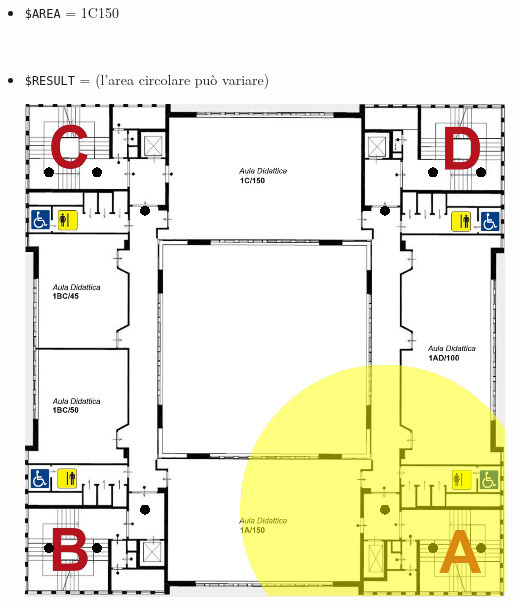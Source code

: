 \documentclass[../../SperimentazioniPratiche.tex]{subfiles}
\begin{document}
			\begin{tcolorbox}[fonttitle=\bfseries, 
								adjusted title={\Large Prova 10A.1}, 
								breakable, 
								sharp corners=south,
								colback=white, 
								colframe=white!60!black]
								
				\begin{description}[leftmargin=0.7cm,labelwidth=!]
				
					\item[Input] \ \par 
        				\begin{itemize}
        					\item \verb|$AREA| = 1C150
        				\end{itemize}
        				
        			\tcbline 
        				
        			\item[Output atteso] \ \par
        				\begin{itemize}
        					\item \verb|$RESULT| = (l'area circolare può variare)
        					\begin{center}
        						\includegraphics[scale=0.3]{img/ResultProva10A}
        					\end{center}
        				\end{itemize}


\end{description}
\end{tcolorbox}
\end{document}
